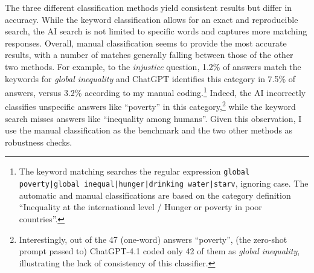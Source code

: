\documentclass[12pt,english]{article}
\begin{document}
\begin{bibunit}
The three different classification methods yield consistent results but differ in accuracy. While the keyword classification allows for an exact and reproducible search, the AI search is not limited to specific words and captures more matching responses. %
Overall, manual classification seems to provide the most accurate results, with a number of matches generally falling between those of the other two methods. 
For example, to the \textit{injustice} question, 1.2\% of answers match the keywords for \textit{global inequality} and ChatGPT identifies this category in 7.5\% of answers, versus 3.2\% according to my manual coding.\footnote{The keyword matching searches the regular expression \texttt{global poverty\allowbreak|global inequal\allowbreak|hunger|drinking water|starv}, ignoring case. The automatic and manual classifications are based on the category definition ``Inequality at the international %
level / Hunger or poverty in poor countries''.} 
Indeed, the AI incorrectly classifies unspecific answers like ``poverty'' in this category,\footnote{Interestingly, out of the 47  (one-word) answers ``poverty'', (the zero-shot prompt passed to) ChatGPT-4.1 coded only 42 of them as \textit{global inequality}, illustrating the lack of consistency of this classifier.} while the keyword search misses answers like ``inequality among humans''. 
Given this observation, I use the manual classification as the benchmark and the two other methods as robustness checks.


\end{bibunit}
\end{document}

